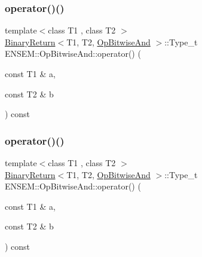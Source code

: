 \subsubsection{\texorpdfstring{operator()()}{operator()()}\hspace{0.1cm}{\footnotesize\ttfamily [1/3]}}
{\footnotesize\ttfamily template$<$class T1 , class T2 $>$ \\
\mbox{\hyperlink{structENSEM_1_1BinaryReturn}{Binary\+Return}}$<$T1, T2, \mbox{\hyperlink{structENSEM_1_1OpBitwiseAnd}{Op\+Bitwise\+And}} $>$\+::Type\+\_\+t E\+N\+S\+E\+M\+::\+Op\+Bitwise\+And\+::operator() (\begin{DoxyParamCaption}\item[{const T1 \&}]{a,  }\item[{const T2 \&}]{b }\end{DoxyParamCaption}) const\hspace{0.3cm}{\ttfamily [inline]}}

\mbox{\label{structENSEM_1_1OpBitwiseAnd_aa0d3491aacf78f315c39f90394d4fa86}} 
\subsubsection{\texorpdfstring{operator()()}{operator()()}\hspace{0.1cm}{\footnotesize\ttfamily [2/3]}}
{\footnotesize\ttfamily template$<$class T1 , class T2 $>$ \\
\mbox{\hyperlink{structENSEM_1_1BinaryReturn}{Binary\+Return}}$<$T1, T2, \mbox{\hyperlink{structENSEM_1_1OpBitwiseAnd}{Op\+Bitwise\+And}} $>$\+::Type\+\_\+t E\+N\+S\+E\+M\+::\+Op\+Bitwise\+And\+::operator() (\begin{DoxyParamCaption}\item[{const T1 \&}]{a,  }\item[{const T2 \&}]{b }\end{DoxyParamCaption}) const\hspace{0.3cm}{\ttfamily [inline]}}

\mbox{\label{structENSEM_1_1OpBitwiseAnd_aa0d3491aacf78f315c39f90394d4fa86}} 
